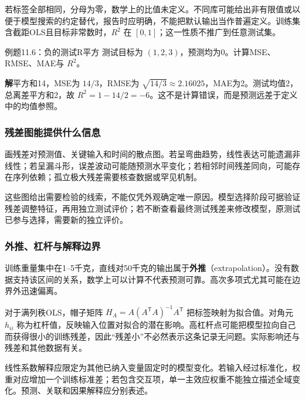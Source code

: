 \documentclass[UTF8,fontset=none,zihao=-4,a4paper]{ctexart}
\newcommand{\term}[1]{\textbf{#1}}
\newcommand{\sol}{\par\noindent\textbf{解}\quad}
\numberwithin{equation}{section}
\numberwithin{figure}{section}
\begin{document}
若标签全部相同，分母为零，数学上的比值未定义。不同库可能给出非有限值或以便于模型搜索的约定替代，报告时应明确，不能把默认输出当作普遍定义。训练集含截距OLS且目标非常数时，$R^2$ 在 $[0,1]$；这一性质不推广到任意测试集。

\begin{infobox}{例题11.6：负的测试R平方}
测试目标为 $(1,2,3)$，预测均为0。计算MSE、RMSE、MAE与 $R^2$。
\end{infobox}
\sol 平方和14，MSE为 $14/3$，RMSE为 $\sqrt{14/3}\approx2.16025$，MAE为2。测试均值2，总离差平方和2，故 $R^2=1-14/2=-6$。这不是计算错误，而是预测远差于定义中的均值参照。

\subsubsection{残差图能提供什么信息}
画残差对预测值、关键输入和时间的散点图。若呈弯曲趋势，线性表达可能遗漏非线性；若呈漏斗形，误差波动可能随预测水平变化；若相邻时间残差同向，可能存在序列依赖；孤立极大残差需要核查数据或罕见机制。

这些图给出需要检验的线索，不能仅凭外观确定唯一原因。模型选择阶段可据验证残差调整特征，再用独立测试评价；若不断查看最终测试残差来修改模型，原测试已参与选择，需要新的独立评价。

\subsubsection{外推、杠杆与解释边界}
训练重量集中在1--5千克，直线对50千克的输出属于\term{外推}（extrapolation）。没有数据支持该区间的关系，数学上可以计算不代表预测可靠。高次多项式尤其可能在边界外迅速偏离。

对于满列秩OLS，帽子矩阵 $H_A=A(A^{\mathsf T}A)^{-1}A^{\mathsf T}$ 把标签映射为拟合值。对角元 $h_{ii}$ 称为杠杆值，反映输入位置对拟合的潜在影响。高杠杆点可能把模型拉向自己而获得很小的训练残差，因此“残差小”不必然表示这条记录无问题。实际影响还与残差和其他数据有关。

线性系数解释应限定为其他已纳入变量固定时的模型变化。若输入经过标准化，权重对应增加一个训练标准差；若包含交互项，单一主效应权重不能独立描述全域变化。预测、关联和因果解释应分别表述。
\end{document}
